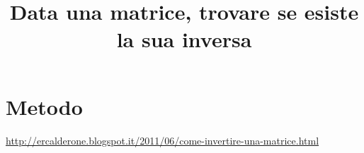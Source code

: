 \documentclass[a4paper,10pt]{article}
\title{Data una matrice, trovare se esiste la sua inversa}
\author{}
\begin{document}
\maketitle

\begin{abstract}

\end{abstract}

\section{Metodo}
\url{http://ercalderone.blogspot.it/2011/06/come-invertire-una-matrice.html}
\end{document}
